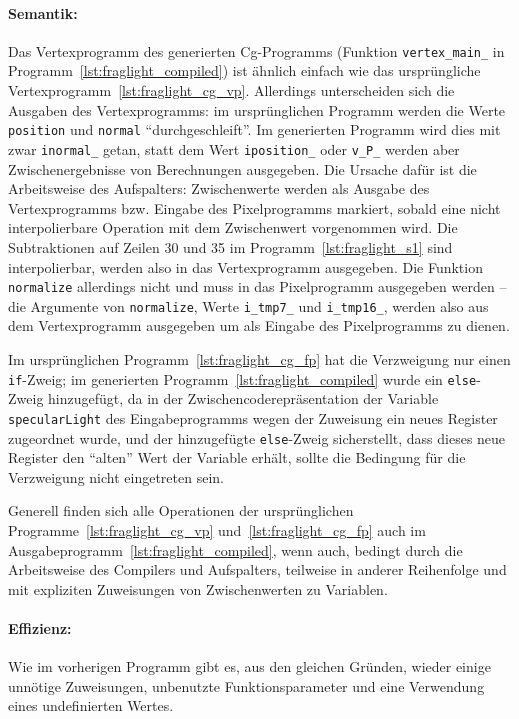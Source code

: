 \documentclass[twoside,a4paper,fleqn,12pt]{book}
\begin{document}
\paragraph{Semantik:}
Das Vertexprogramm des generierten Cg-Programms (Funktion \verb+vertex_main_+ in Programm~\ref{lst:fraglight_compiled})
ist ähnlich einfach wie das ursprüngliche Vertexprogramm~\ref{lst:fraglight_cg_vp}.
Allerdings unterscheiden sich die Ausgaben des Vertexprogramms: im ursprünglichen Programm
werden die Werte \verb+position+ und \verb+normal+ "`durchgeschleift"'. Im generierten Programm wird
dies mit zwar \verb+inormal_+ getan, statt dem Wert \verb+iposition_+ oder \verb+v_P_+ werden aber
Zwischenergebnisse von Berechnungen ausgegeben. Die Ursache dafür ist die Arbeitsweise des Aufspalters:
Zwischenwerte werden als Ausgabe des Vertexprogramms bzw. Eingabe des Pixelprogramms markiert,
sobald eine nicht interpolierbare Operation mit dem Zwischenwert vorgenommen wird.
Die Subtraktionen auf Zeilen 30 und 35 im Programm~\ref{lst:fraglight_s1} sind interpolierbar, werden
also in das Vertexprogramm ausgegeben. Die Funktion \verb+normalize+ allerdings nicht und 
muss in das Pixelprogramm ausgegeben werden -- die Argumente von \verb+normalize+, Werte \verb+i_tmp7_+ und
\verb+i_tmp16_+, werden also aus dem Vertexprogramm ausgegeben um als Eingabe des Pixelprogramms
zu dienen.

Im ursprünglichen Programm~\ref{lst:fraglight_cg_fp} hat die Verzweigung nur einen \verb+if+-Zweig; im generierten
Programm~\ref{lst:fraglight_compiled} wurde ein \verb+else+-Zweig hinzugefügt, da in der Zwischencoderepräsentation
der Variable \verb+specularLight+ des Eingabeprogramms wegen der Zuweisung ein neues Register zugeordnet wurde,
und der hinzugefügte \verb+else+-Zweig sicherstellt, dass dieses neue Register den "`alten"' Wert der Variable erhält,
sollte die Bedingung für die Verzweigung nicht eingetreten sein.

Generell finden sich alle Operationen der ursprünglichen Programme~\ref{lst:fraglight_cg_vp} und~\ref{lst:fraglight_cg_fp}
auch im Ausgabeprogramm~\ref{lst:fraglight_compiled}, wenn auch, bedingt durch die Arbeitsweise des
Compilers und Aufspalters, teilweise in anderer Reihenfolge und mit expliziten Zuweisungen von Zwischenwerten zu Variablen.

\paragraph{Effizienz:}
Wie im vorherigen Programm gibt es, aus den gleichen Gründen, wieder einige unnötige Zuweisungen,
unbenutzte Funktionsparameter und eine Verwendung eines undefinierten Wertes.
\end{document}
